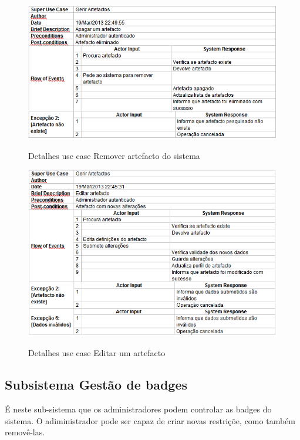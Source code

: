 ﻿\documentclass[12pt,a4paper]{article}
\begin{document}
\begin{figure}[h!]
\centering
\includegraphics[scale=0.7]{d_usecase/A_removerartefacto}
\label{usecase}
\caption{Detalhes use case Remover artefacto do sistema}
\end{figure}

\begin{figure}[h!]
\centering
\includegraphics[scale=0.7]{d_usecase/A_editarartefacto}
\label{usecase}
\caption{Detalhes use case Editar um artefacto}
\end{figure}

\clearpage

\subsection{Subsistema Gestão de badges}
É neste sub-sistema que os administradores podem controlar as badges do sistema. O
adiministrador pode ser capaz de criar novas restriçõe, como também removê-las.\\
\end{document}
